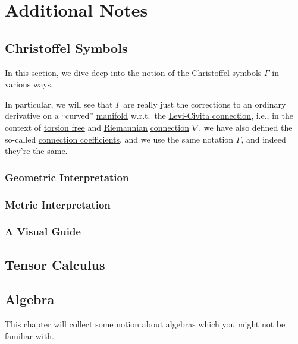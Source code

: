 \chapter{Additional Notes}
\section{Christoffel Symbols}\label{section:Christoffel-symbols}
In this section, we dive deep into the notion of the \hyperref[not:Christoffel-symbol]{Christoffel symbols} \(\Gamma \) in various ways.

In particular, we will see that \(\Gamma \) are really just the corrections to an ordinary derivative on a ``curved'' \hyperref[def:smooth-manifold]{manifold} w.r.t.\ the \hyperref[def:Levi-Civita-connection]{Levi-Civita connection}, i.e., in the context of \hyperref[def:torsion-free]{torsion free} and \hyperref[def:Riemannian]{Riemannian} \hyperref[def:linear-connection]{connection} \(\nabla \), we have also defined the so-called \hyperref[not:connection-coefficient]{connection coefficients}, and we use the same notation \(\Gamma \), and indeed they're the same.

\subsection{Geometric Interpretation}

\subsection{Metric Interpretation}

\subsection{A Visual Guide}

\section{Tensor Calculus}

\section{Algebra}
This chapter will collect some notion about algebras which you might not be familiar with.

